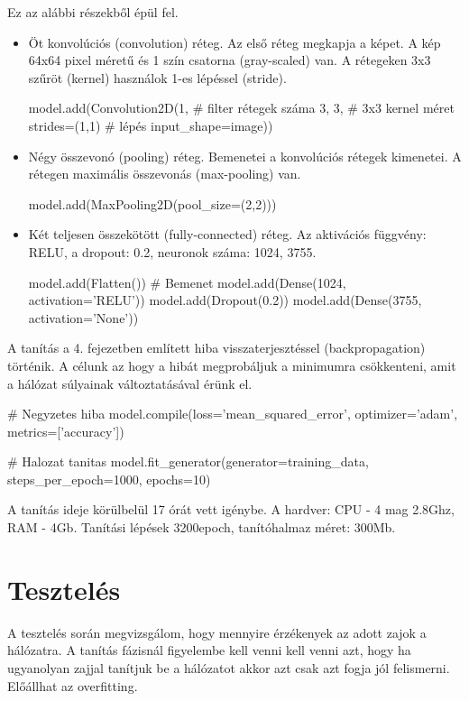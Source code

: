 Ez az alábbi részekből épül fel.
\begin{itemize}
\item Öt konvolúciós (convolution) réteg. Az első réteg megkapja a képet. A kép 64x64 pixel méretű és 1 szín csatorna (gray-scaled) van. A rétegeken 3x3 szűröt (kernel) használok 1-es lépéssel (stride).
\begin{python}
model.add(Convolution2D(1,	# filter rétegek száma    
                        3, 3,	# 3x3 kernel méret 
                        strides=(1,1) # lépés
                        input_shape=image))
\end{python}
\item Négy összevonó (pooling) réteg. Bemenetei a konvolúciós rétegek kimenetei. A rétegen maximális összevonás (max-pooling) van.
\begin{python}
model.add(MaxPooling2D(pool_size=(2,2)))
\end{python}
\item Két teljesen összekötött (fully-connected) réteg. Az aktivációs függvény: RELU, a dropout: 0.2, neuronok száma: 1024, 3755.
\begin{python}
model.add(Flatten()) # Bemenet
model.add(Dense(1024, activation='RELU'))
model.add(Dropout(0.2))
model.add(Dense(3755, activation='None'))
\end{python}
\end{itemize}

A tanítás a 4. fejezetben említett hiba visszaterjesztéssel (backpropagation) történik. A célunk az hogy a hibát megprobáljuk a minimumra csökkenteni, amit a hálózat súlyainak változtatásával érünk el.

\begin{python}
# Negyzetes hiba
model.compile(loss='mean_squared_error',
              optimizer='adam',
              metrics=['accuracy'])

# Halozat tanitas
model.fit_generator(generator=training_data,
                    steps_per_epoch=1000, epochs=10)
\end{python}

A tanítás ideje körülbelül 17 órát vett igénybe. A hardver: CPU - 4 mag 2.8Ghz, RAM - 4Gb. Tanítási lépések 3200epoch, tanítóhalmaz méret: 300Mb.

\section{Tesztelés}

A tesztelés során megvizsgálom, hogy mennyire érzékenyek az adott zajok a hálózatra. A tanítás fázisnál figyelembe kell venni kell venni azt, hogy ha ugyanolyan zajjal tanítjuk be a  hálózatot akkor azt csak azt fogja jól felismerni. Előállhat az overfitting.

